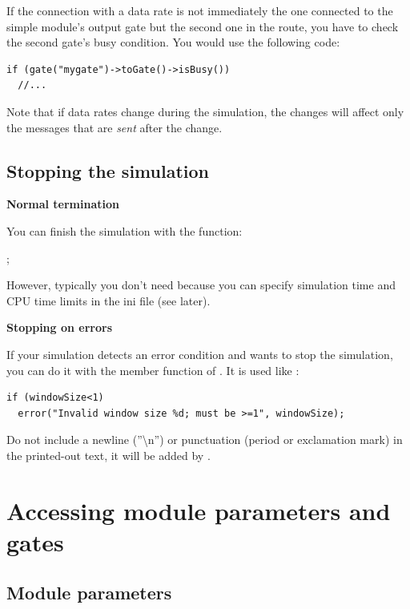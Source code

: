 If the connection with a data rate is not immediately the one
connected to the simple module's output gate but
the second one in the route, you have to check the second gate's busy
condition.  You would use the following code:

\begin{Verbatim}
if (gate("mygate")->toGate()->isBusy()) 
  //...
\end{Verbatim}


Note that if data rates change during the
simulation, the changes will affect only the messages that are
\textit{sent} after the change.



\subsection{Stopping the simulation}

\textbf{Normal termination}


You can finish the simulation with the  function:


;


However, typically you don't need  because you
can specify simulation time and CPU time limits in the ini file (see later).


\textbf{Stopping on errors}


If your simulation detects an error condition and wants to stop 
the simulation, you can do it with the  member function 
of . It is used like :

\begin{Verbatim}
if (windowSize<1)
  error("Invalid window size %d; must be >=1", windowSize);
\end{Verbatim}  


Do not include a newline (''{\textbackslash}n'') or punctuation (period 
or exclamation mark) in the printed-out text, it will be added 
by {\opp}.





\section{Accessing module parameters and gates}

\subsection{Module parameters}

